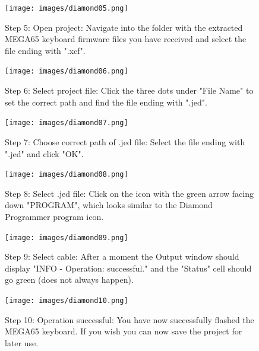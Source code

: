 \begin{figure}[H]
  \centering
  \texttt{[image: images/diamond05.png]}
  \captionsetup{width=0.8\linewidth}
  \caption{Step 5: Open project:
           Navigate into the folder with the extracted MEGA65 keyboard
           firmware files you have received and select the file ending with ".xcf".}
  \label{fig:diamond05}

\vspace{5mm}

  \texttt{[image: images/diamond06.png]}
  \captionsetup{width=0.8\linewidth}
  \caption{Step 6: Select project file:
           Click the three dots under "File Name" to set the correct
           path and find the file ending with ".jed".}
  \label{fig:diamond06}
\end{figure}


\begin{figure}[H]
  \centering
  \texttt{[image: images/diamond07.png]}
  \captionsetup{width=0.8\linewidth}
  \caption{Step 7: Choose correct path of .jed file:
           Select the file ending with ".jed" and click "OK".}
  \label{fig:diamond07}

\vspace{5mm}

  \texttt{[image: images/diamond08.png]}
  \captionsetup{width=0.8\linewidth}
  \caption{Step 8: Select .jed file:
           Click on the icon with the green arrow facing down "PROGRAM",
           which looks similar to the Diamond Programmer program icon.}
  \label{fig:diamond08}
\end{figure}


\begin{figure}[H]
  \centering
  \texttt{[image: images/diamond09.png]}
  \captionsetup{width=0.8\linewidth}
  \caption{Step 9: Select cable:
           After a moment the Output window should display
           "INFO - Operation: successful." and the "Status" cell should
           go green (does not always happen).}
  \label{fig:diamond09}

\vspace{5mm}

  \texttt{[image: images/diamond10.png]}
  \captionsetup{width=0.8\linewidth}
  \caption{Step 10: Operation successful:
           You have now successfully flashed the MEGA65 keyboard.
           If you wish you can now save the project for later use.}
  \label{fig:diamond10}
\end{figure}


